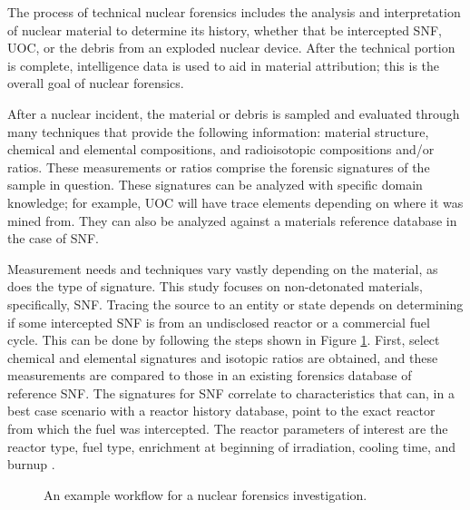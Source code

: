 The process of technical nuclear forensics includes the analysis and
interpretation of nuclear material to determine its history, whether that be
intercepted \gls{SNF}, \gls{UOC}, or the debris from an exploded nuclear
device. After the technical portion is complete, intelligence data is used
to aid in material attribution; this is the overall goal of nuclear forensics.

After a nuclear incident, the material or debris is sampled and evaluated
through many techniques that provide the following information: material
structure, chemical and elemental compositions, and radioisotopic compositions
and/or ratios.  These measurements or ratios comprise the forensic signatures
of the sample in question. These signatures can be analyzed with specific
domain knowledge; for example, \gls{UOC} will have trace elements depending on
where it was mined from.  They can also be analyzed against a materials
reference database in the case of \gls{SNF}.

Measurement needs and techniques vary vastly depending on the material, as does
the type of signature. This study focuses on non-detonated materials,
specifically, \gls{SNF}. Tracing the source to an entity or state depends on
determining if some intercepted \gls{SNF} is from an undisclosed reactor or a
commercial fuel cycle. This can be done by following the steps shown in Figure
\ref{fig:rwforensics}.  First, select chemical and elemental signatures and
isotopic ratios are obtained, and these measurements are compared to those in
an existing forensics database of reference \gls{SNF}.  The signatures for
\gls{SNF} correlate to characteristics that can, in a best case scenario with a
reactor history database, point to the exact reactor from which the fuel was
intercepted.  The reactor parameters of interest are the reactor type, fuel
type, enrichment at beginning of irradiation, cooling time, and burnup
\cite{weber_2006, weber_2010, weber_2011}.

\begin{figure}[!tbh]
  \caption[Example nuclear forensics investigation workflow]
          {An example workflow for a nuclear forensics investigation.}
  \label{fig:rwforensics}
\end{figure}

